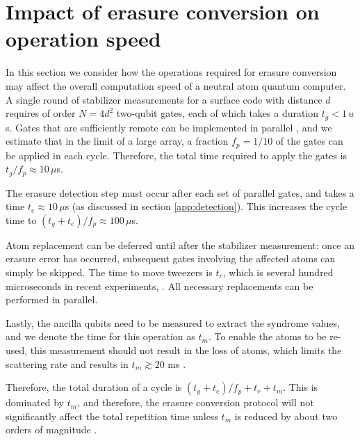 \documentclass[%
reprint,
superscriptaddress,
 amsmath,amssymb,
 aps,
 prx,
floatfix,
]{revtex4-1}
\begin{document}
\section{Impact of erasure conversion on operation speed}

In this section we consider how the operations required for erasure conversion may affect the overall computation speed of a neutral atom quantum computer. A single round of stabilizer measurements for a surface code with distance $d$ requires of order $N=4d^2$ two-qubit gates, each of which takes a duration $t_g < 1\,u$s. Gates that are sufficiently remote can be implemented in parallel \cite{Levine2019,Graham2019}, and we estimate that in the limit of a large array, a fraction $f_p=1/10$ of the gates can be applied in each cycle. Therefore, the total time required to apply the gates is $t_g/f_p \approx 10\,\mu$s.

The erasure detection step must occur after each set of parallel gates, and takes a time $t_e \approx 10\,\mu$s (as discussed in section \ref{app:detection}). This increases the cycle time to $(t_g+t_e)/f_p \approx 100\,\mu$s.

Atom replacement can be deferred until after the stabilizer measurement: once an erasure error has occurred, subsequent gates involving the affected atoms can simply be skipped. The time to move tweezers is $t_r$, which is several hundred microseconds in recent experiments, \cite{bluvstein2021}. All necessary replacements can be performed in parallel. 

Lastly, the ancilla qubits need to be measured to extract the syndrome values, and we denote the time for this operation as $t_m$. To enable the atoms to be re-used, this measurement should not result in the loss of atoms, which limits the scattering rate and results in $t_m \gtrsim 20$ ms \cite{Saskin2019,ma2021}.

Therefore, the total duration of a cycle is $(t_g+t_e)/f_p + t_r + t_m$. This is dominated by $t_m$, and therefore, the erasure conversion protocol will not significantly affect the total repetition time unless $t_m$ is reduced by about two orders of magnitude \cite{xu2021}.
\end{document}
